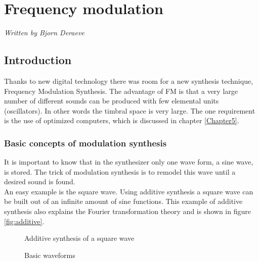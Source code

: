 \chapter{Frequency modulation} %
\label{Chapter2} %
\textsf{\textsl{Written by Bjorn Deraeve}}

\section{Introduction}
Thanks to new digital technology there was room for a new synthesis technique, Frequency Modulation Synthesis. The advantage of FM is that a very large number of different sounds can be produced with few elemental units (oscillators). In other words the timbral space is very large. The one requirement is the use of optimized computers, which is discussed in chapter \ref{Chapter5}.

\subsection{Basic concepts of modulation synthesis}
It is important to know that in the synthesizer only one wave form, a sine wave, is stored. The trick of modulation synthesis is to remodel this wave until a desired sound is found. \\ An easy example is the square wave. Using additive synthesis a square wave can be built out of an infinite amount of sine functions. This example of additive synthesis also explains the Fourier transformation theory and is shown in figure \ref{fig:additive}.
\begin{figure}[ht]
  \hfill
  \begin{minipage}[t]{.45\textwidth}
    \begin{center}  
      \caption{Additive synthesis of a square wave}
      \label{fig:additive}
    \end{center}
  \end{minipage}
  \hfill
  \begin{minipage}[t]{.45\textwidth}
    \begin{center}  
      \caption{Basic waveforms}
      \label{fig:basicWaveforms}
    \end{center}
  \end{minipage}
  \hfill
\end{figure}
